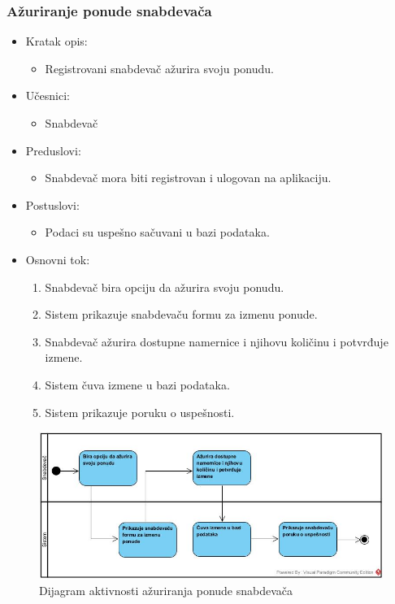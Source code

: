 \subsubsection{Ažuriranje ponude snabdevača}

\begin{itemize}
    \item Kratak opis:
        \begin{itemize}
            \item Registrovani snabdevač ažurira svoju ponudu.
        \end{itemize}
    \item Učesnici:
        \begin{itemize}
            \item Snabdevač
        \end{itemize}
    \item Preduslovi:
        \begin{itemize}
            \item Snabdevač mora biti registrovan i ulogovan na aplikaciju.
        \end{itemize}
    \item Postuslovi:
        \begin{itemize}
            \item Podaci su uspešno sačuvani u bazi podataka.
        \end{itemize}
    \item Osnovni tok:
        \begin{enumerate}
            \item Snabdevač bira opciju da ažurira svoju ponudu.
            \item Sistem prikazuje snabdevaču formu za izmenu ponude.
            \item Snabdevač ažurira dostupne namernice i njihovu količinu i potvrđuje izmene.
            \item Sistem čuva izmene u bazi podataka.
            \item Sistem prikazuje poruku o uspešnosti. 
        \end{enumerate}
\end{itemize}


\begin{figure}[H]
\begin{center}
\includegraphics[width=\textwidth]{Pictures/activity_update_supplier_account.jpg}
\end{center}
    \caption{Dijagram aktivnosti ažuriranja ponude snabdevača}
\label{fig:ActivityUpdateSupplierAccount}
\end{figure}
